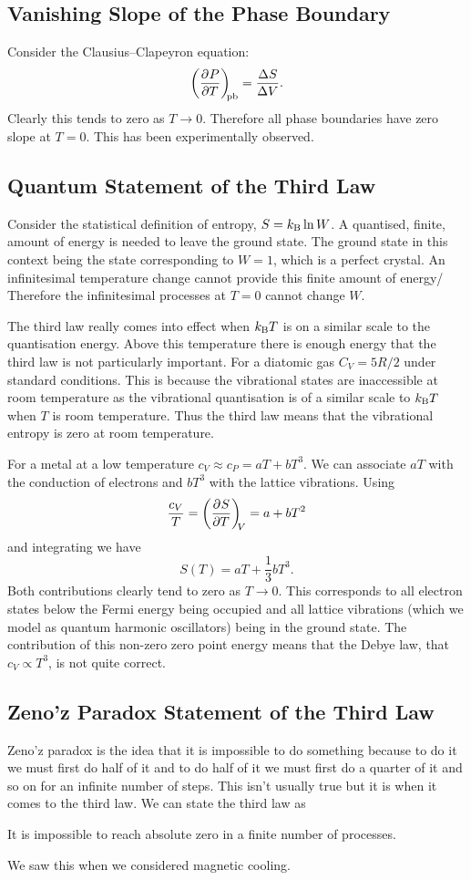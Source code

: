     \subsection{Vanishing Slope of the Phase Boundary}
    Consider the Clausius--Clapeyron equation:
    \[\left(\pdv[]{P}{T}\right)_{\!\!{\mathrm{pb}}} = \frac{\Delta S}{\Delta V}.\]
    Clearly this tends to zero as \(T\to 0\).
    Therefore all phase boundaries have zero slope at \(T = 0\).
    This has been experimentally observed.
    
    \subsection{Quantum Statement of the Third Law}
    Consider the statistical definition of entropy, \(S = k_\mathrm{B}\ln W\).
    A quantised, finite, amount of energy is needed to leave the ground state.
    The ground state in this context being the state corresponding to \(W = 1\), which is a perfect crystal.
    An infinitesimal temperature change cannot provide this finite amount of energy/
    Therefore the infinitesimal processes at \(T = 0\) cannot change \(W\).
    
    The third law really comes into effect when \(k_\mathrm{B} T\) is on a similar scale to the quantisation energy.
    Above this temperature there is enough energy that the third law is not particularly important.
    For a diatomic gas \(C_V = 5R/2\) under standard conditions.
    This is because the vibrational states are inaccessible at room temperature as the vibrational quantisation is of a similar scale to \(k_\mathrm{B} T\) when \(T\) is room temperature.
    Thus the third law means that the vibrational entropy is zero at room temperature.
    
    For a metal at a low temperature \(c_V \approx c_P = aT + bT^3\).
    We can associate \(aT\) with the conduction of electrons and \(bT^3\) with the lattice vibrations.
    Using
    \[\frac{c_V}{T} = \left(\pdv[]{S}{T}\right)_{\!\!{V}} = a + bT^2\]
    and integrating we have
    \[S(T) = aT + \frac{1}{3}bT^3.\]
    Both contributions clearly tend to zero as \(T \to 0\).
    This corresponds to all electron states below the Fermi energy being occupied and all lattice vibrations (which we model as quantum harmonic oscillators) being in the ground state.
    The contribution of this non-zero zero point energy means that the Debye law, that \(c_V \propto T^3\), is not quite correct.
    
    \subsection{Zeno'z Paradox Statement of the Third Law}
    Zeno'z paradox is the idea that it is impossible to do something because to do it we must first do half of it and to do half of it we must first do a quarter of it and so on for an infinite number of steps.
    This isn't usually true but it is when it comes to the third law.
    We can state the third law as
    \begin{displayquote}
        It is impossible to reach absolute zero in a finite number of processes.
    \end{displayquote}
    We saw this when we considered magnetic cooling.
    
